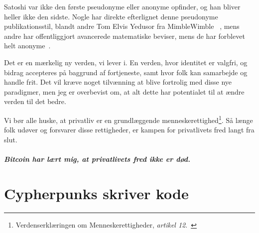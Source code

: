 \documentclass[paper=6in:9in,pagesize=pdftex,
               headinclude=on,footinclude=on,12pt]{scrbook}
\begin{document}
Satoshi var ikke den første pseudonyme eller anonyme opfinder, og han bliver heller ikke den sidste. Nogle har direkte efterlignet denne pseudonyme publikationsstil, blandt andre Tom Elvis Yedusor fra MimbleWimble~\cite{mimblewimble-origin} , mens andre har offentliggjort avancerede matematiske beviser, mens de har forblevet helt anonyme~\cite{4chan-math}.

Det er en mærkelig ny verden, vi lever i. En verden, hvor identitet er valgfri, og bidrag accepteres på baggrund af fortjeneste, samt hvor folk kan samarbejde og handle frit. Det vil kræve noget tilvænning at blive fortrolig med disse nye paradigmer, men jeg er overbevist om, at alt dette har potentialet til at ændre verden til det bedre.

Vi bør alle huske, at privatliv er en grundlæggende menneskerettighed\footnote{Verdenserklæringen om Menneskerettigheder, \textit{artikel 12}.~\cite{article12}}. Så længe folk udøver og forsvarer disse rettigheder, er kampen for privatlivets fred langt fra slut.\paragraph{Bitcoin har lært mig, at privatlivets fred ikke er død.}%
%
%
%
%

\chapter{Cypherpunks skriver kode}
\label{les:20}
\end{document}
